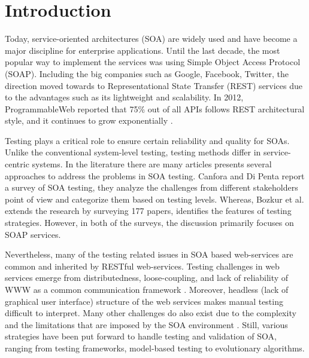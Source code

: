 \documentclass[english]{tktltiki}
\begin{document}
\section{Introduction}
Today, service-oriented architectures (SOA) are widely used and have become a major discipline for enterprise applications. Until the last decade, the most popular way to implement the services was using Simple Object Access Protocol (SOAP). Including the big companies such as Google, Facebook, Twitter, the direction moved towards to Representational State Transfer (REST) services due to the advantages such as its lightweight and scalability. In 2012, ProgrammableWeb reported that 75\% out of all APIs follows REST architectural style, and it continues to grow exponentially \cite{programmableweb}.

Testing plays a critical role to ensure certain reliability and quality for SOAs. Unlike the conventional system-level testing, testing methods differ in service-centric systems. In the literature there are many articles presents several approaches to address the problems in SOA testing. Canfora and Di Penta \cite{canfora2009service} report a survey of SOA testing, they analyze the challenges from different stakeholders point of view and categorize them based on testing levels. Whereas, Bozkur et al. \cite{bozkurt2013testing} extends the research by surveying 177 papers, identifies the features of testing strategies. However, in both of the surveys, the discussion primarily focuses on SOAP services.

Nevertheless, many of the testing related issues in SOA based web-services are common and inherited by RESTful web-services. Testing challenges in web services emerge from distributedness, loose-coupling, and lack of reliability of WWW as a common communication framework \cite{chakrabarti2009test}. Moreover, headless (lack of graphical user interface) structure of the web services makes manual testing difficult to interpret. Many other challenges do also exist due to the complexity and the limitations that are imposed by the SOA environment \cite{canfora2006testing, canfora2009service, bozkurt2013testing}. Still, various strategies have been put forward to handle testing and validation of SOA, ranging from testing frameworks, model-based testing to evolutionary algorithms.
\end{document}
